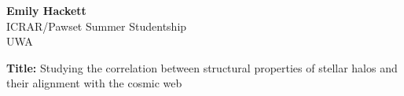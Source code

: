 \documentclass[class=article, crop=false]{standalone}
\newcommand{\studentname}[1]{\noindent\textbf{#1}\\}
\newcommand{\studentprogram}[1]{\noindent #1\\}
\newcommand{\studentaffiliation}[1]{\noindent #1\\\vspace{1em}}
\newcommand{\studenttitle}[1]{\noindent\textbf{Title: }#1\\\vspace{1em}}
\begin{document}


\studentname{Emily Hackett}
\studentprogram{ICRAR/Pawset Summer Studentship} %
\studentaffiliation{UWA} %


\studenttitle{Studying the correlation between structural properties of stellar halos and their alignment with the cosmic web}





\end{document}
